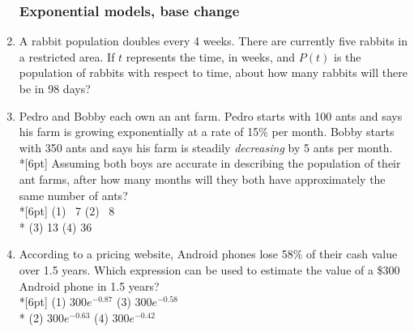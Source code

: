 \documentclass[12pt, oneside]{article}
\begin{document}
\begin{enumerate}
\subsubsection*{Exponential models, base change}
\item A rabbit population doubles every 4 weeks. There are currently five rabbits in a restricted area. If $t$ represents the time, in weeks, and $P(t)$ is the population of rabbits with respect to time, about how many rabbits will there be in 98 days?

\item Pedro and Bobby each own an ant farm. Pedro starts with 100 ants and says his farm is growing exponentially at a rate of 15\% per month. Bobby starts with 350 ants and says his farm is steadily \textit{decreasing} by 5 ants per month.\\*[6pt]
Assuming both boys are accurate in describing the population of their ant farms, after how many months will they both have approximately the same number of ants?\\*[6pt]
(1) \, 7 \qquad (2) \, 8 \\*
(3) 13 \qquad (4) 36

\item According to a pricing website, Android phones lose 58\% of their cash value over 1.5 years. Which expression can be used to estimate the value of a \$300 Android phone in 1.5 years?\\*[6pt]
(1) $300e^{-0.87}$ \qquad (3) $300e^{-0.58}$ \\*
(2) $300e^{-0.63}$ \qquad (4) $300e^{-0.42}$


\end{enumerate}
\end{document}
